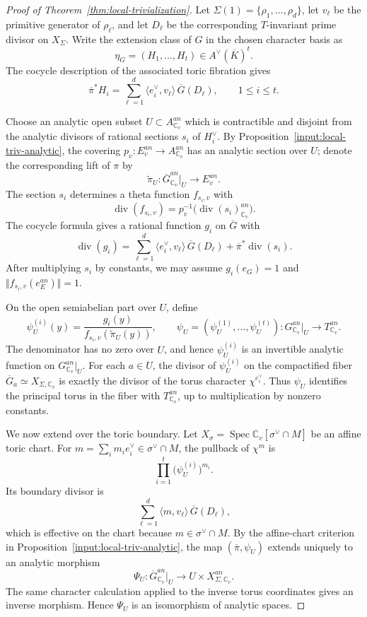 \documentclass[10pt,a4paper]{amsart}
\theoremstyle{plain}
\theoremstyle{plain}
\numberwithin{equation}{section}
\begin{document}
\begin{proof}[Proof of Theorem~\ref{thm:local-trivialization}]
	Let \(\Sigma(1)=\{\rho_1,\ldots,\rho_d\}\), let \(v_\ell\) be the primitive
	generator of \(\rho_\ell\), and let \(D_\ell\) be the corresponding
	\(T\)-invariant prime divisor on \(X_\Sigma\).  Write the extension class of
	\(G\) in the chosen character basis as
	\[
	\eta_G=(H_1,\ldots,H_t)\in A^\vee(\overline K)^t .
	\]
	The cocycle description of the associated toric fibration gives
	\[
	\overline{\pi}^*H_i
	=
	\sum_{\ell=1}^{d}\langle e_i^\vee,v_\ell\rangle\,\overline G(D_\ell),
	\qquad 1\le i\le t.
	\]
	
	Choose an analytic open subset \(U\subset A_{\mathbb C_v}^{an}\) which is
	contractible and disjoint from the analytic divisors of rational sections
	\(s_i\) of \(H_i^\vee\).  By Proposition~\ref{input:local-triv-analytic}, the
	covering \(p_v:E_v^{an}\to A_{\mathbb C_v}^{an}\) has an analytic section over
	\(U\); denote the corresponding lift of \(\pi\) by
	\[
	\widetilde\pi_U:\overline G^{an}_{\mathbb C_v}|_U\longrightarrow E_v^{an}.
	\]
	The section \(s_i\) determines a theta function \(f_{s_i,v}\) with
	\[
	\operatorname{div}(f_{s_i,v})
	=
	p_v^{-1}\bigl(\operatorname{div}(s_i)^{an}_{\mathbb C_v}\bigr).
	\]
	The cocycle formula gives a rational function \(g_i\) on \(\overline G\) with
	\[
	\operatorname{div}(g_i)
	=
	\sum_{\ell=1}^{d}\langle e_i^\vee,v_\ell\rangle\,\overline G(D_\ell)
	+\overline\pi^*\operatorname{div}(s_i).
	\]
	After multiplying \(s_i\) by constants, we may assume
	\(g_i(e_G)=1\) and \(\Vert f_{s_i,v}(e_E^{an})\Vert=1\).
	
	On the open semiabelian part over \(U\), define
	\[
	\psi_U^{(i)}(y)
	=
	\frac{g_i(y)}{f_{s_i,v}(\widetilde\pi_U(y))},
	\qquad
	\psi_U=(\psi_U^{(1)},\ldots,\psi_U^{(t)}):G^{an}_{\mathbb C_v}|_U\to T^{an}_{\mathbb C_v}.
	\]
	The denominator has no zero over \(U\), and hence \(\psi_U^{(i)}\) is an
	invertible analytic function on \(G^{an}_{\mathbb C_v}|_U\).
	For each \(a\in U\), the divisor of \(\psi_U^{(i)}\) on the compactified
	fiber \(\overline G_a\simeq X_{\Sigma,\mathbb C_v}\) is exactly the divisor of
	the torus character \(\chi^{e_i^\vee}\).  Thus \(\psi_U\) identifies the
	principal torus in the fiber with \(T_{\mathbb C_v}^{an}\), up to multiplication
	by nonzero constants.
	
	We now extend over the toric boundary.  Let
	\(X_\sigma=\operatorname{Spec}\mathbb C_v[\sigma^\vee\cap M]\) be an affine
	toric chart.  For \(m=\sum_i m_ie_i^\vee\in\sigma^\vee\cap M\), the pullback
	of \(\chi^m\) is
	\[
	\prod_{i=1}^{t}\bigl(\psi_U^{(i)}\bigr)^{m_i}.
	\]
	Its boundary divisor is
	\[
	\sum_{\ell=1}^{d}\langle m,v_\ell\rangle\,\overline G(D_\ell),
	\]
	which is effective on the chart because \(m\in\sigma^\vee\cap M\).  By the
	affine-chart criterion in Proposition~\ref{input:local-triv-analytic}, the map
	\((\overline\pi,\psi_U)\) extends uniquely to an analytic morphism
	\[
	\Psi_U:
	\overline G^{an}_{\mathbb C_v}|_U
	\longrightarrow
	U\times X_{\Sigma,\mathbb C_v}^{an}.
	\]
	The same character calculation applied to the inverse torus coordinates gives
	an inverse morphism.  Hence \(\Psi_U\) is an isomorphism of analytic spaces.
	

\end{proof}
\end{document}

